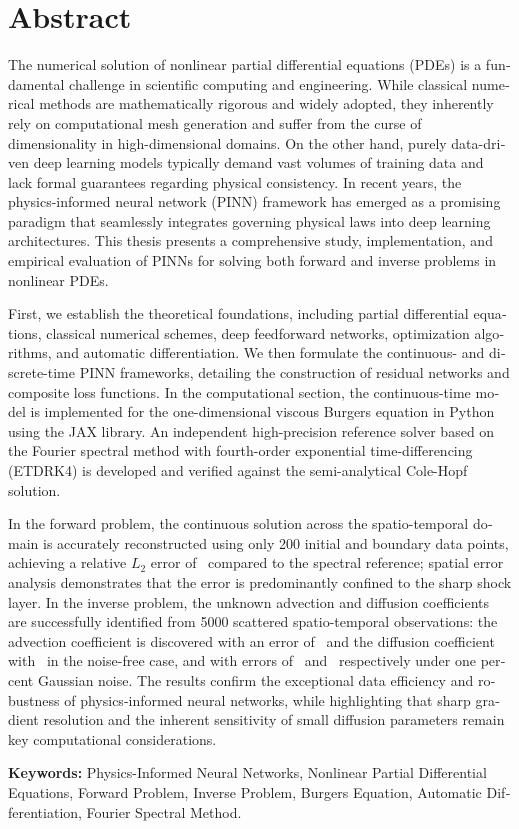 \chapter*{Abstract}
{}
\begin{latin}
The numerical solution of nonlinear partial differential equations (PDEs) is a fundamental challenge in scientific computing and engineering. While classical numerical methods are mathematically rigorous and widely adopted, they inherently rely on computational mesh generation and suffer from the curse of dimensionality in high-dimensional domains. On the other hand, purely data-driven deep learning models typically demand vast volumes of training data and lack formal guarantees regarding physical consistency. In recent years, the physics-informed neural network (PINN) framework has emerged as a promising paradigm that seamlessly integrates governing physical laws into deep learning architectures. This thesis presents a comprehensive study, implementation, and empirical evaluation of PINNs for solving both forward and inverse problems in nonlinear PDEs.

First, we establish the theoretical foundations, including partial differential equations, classical numerical schemes, deep feedforward networks, optimization algorithms, and automatic differentiation. We then formulate the continuous- and discrete-time PINN frameworks, detailing the construction of residual networks and composite loss functions. In the computational section, the continuous-time model is implemented for the one-dimensional viscous Burgers equation in Python using the JAX library. An independent high-precision reference solver based on the Fourier spectral method with fourth-order exponential time-differencing (ETDRK4) is developed and verified against the semi-analytical Cole-Hopf solution.

In the forward problem, the continuous solution across the spatio-temporal domain is accurately reconstructed using only 200 initial and boundary data points, achieving a relative $L_2$ error of \FwdRelErr\ compared to the spectral reference; spatial error analysis demonstrates that the error is predominantly confined to the sharp shock layer. In the inverse problem, the unknown advection and diffusion coefficients are successfully identified from 5000 scattered spatio-temporal observations: the advection coefficient is discovered with an error of \LamIErrClean\ and the diffusion coefficient with \LamIIErrClean\ in the noise-free case, and with errors of \LamIErrNoisy\ and \LamIIErrNoisy\ respectively under one percent Gaussian noise. The results confirm the exceptional data efficiency and robustness of physics-informed neural networks, while highlighting that sharp gradient resolution and the inherent sensitivity of small diffusion parameters remain key computational considerations.

\textbf{Keywords:} Physics-Informed Neural Networks, Nonlinear Partial Differential Equations, Forward Problem, Inverse Problem, Burgers Equation, Automatic Differentiation, Fourier Spectral Method.
\end{latin}
